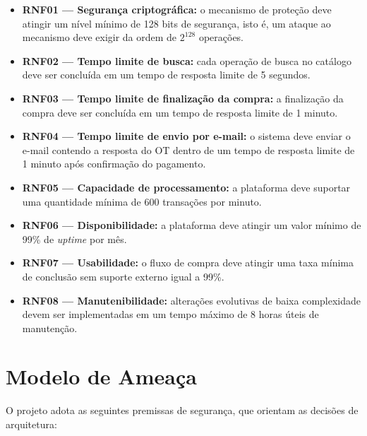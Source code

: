 \begin{itemize}
\item \textbf{RNF01 --- Segurança criptográfica:} o mecanismo de proteção deve
atingir um nível mínimo de 128 bits de segurança, isto é, um ataque ao
mecanismo deve exigir da ordem de $2^{128}$ operações.

\item \textbf{RNF02 --- Tempo limite de busca:} cada operação de busca no
catálogo deve ser concluída em um tempo de resposta limite de 5 segundos.

\item \textbf{RNF03 --- Tempo limite de finalização da compra:} a finalização
da compra deve ser concluída em um tempo de resposta limite de 1 minuto.

\item \textbf{RNF04 --- Tempo limite de envio por e-mail:} o sistema deve
enviar o e-mail contendo a resposta do OT dentro de um tempo de resposta
limite de 1 minuto após confirmação do pagamento.

\item \textbf{RNF05 --- Capacidade de processamento:} a plataforma deve
suportar uma quantidade mínima de 600 transações por minuto.

\item \textbf{RNF06 --- Disponibilidade:} a plataforma deve atingir um valor
mínimo de 99\% de \emph{uptime} por mês.

\item \textbf{RNF07 --- Usabilidade:} o fluxo de compra deve atingir uma taxa
mínima de conclusão sem suporte externo igual a 99\%.

\item \textbf{RNF08 --- Manutenibilidade:} alterações evolutivas de baixa
complexidade devem ser implementadas em um tempo máximo de 8 horas úteis de
manutenção.
\end{itemize}

\section{Modelo de Ameaça}

O projeto adota as seguintes premissas de segurança, que orientam as decisões
de arquitetura:

